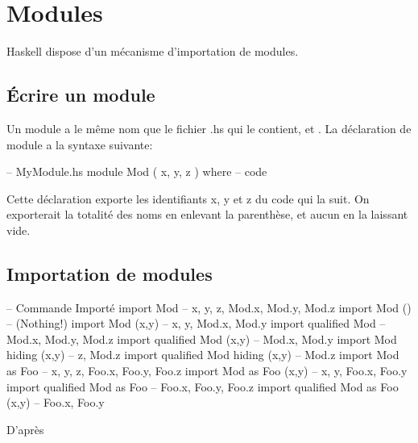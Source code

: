 \section{ Modules}
\label{modules}

Haskell dispose d'un mécanisme d'importation de modules.

\subsection{Écrire un module}

Un module a le même nom que le fichier .hs qui le contient, et . La déclaration de module a la syntaxe suivante:

\begin{haskellcode}
-- MyModule.hs
module Mod
    (
      x,
      y,
      z
    ) where
-- code
\end{haskellcode}

Cette déclaration exporte les identifiants x, y et z du code qui la suit. On exporterait la totalité des noms en enlevant la parenthèse, et aucun en la laissant vide.


\subsection{Importation de modules}
\label{import}

\begin{hslisting*}
\begin{haskellcode}
-- Commande                          Importé
import Mod                        -- x, y, z, Mod.x, Mod.y, Mod.z
import Mod ()                     -- (Nothing!)
import Mod (x,y)                  -- x, y, Mod.x, Mod.y
import qualified Mod              -- Mod.x, Mod.y, Mod.z
import qualified Mod (x,y)        -- Mod.x, Mod.y
import Mod hiding (x,y)           -- z, Mod.z
import qualified Mod hiding (x,y) -- Mod.z
import Mod as Foo                 -- x, y, z, Foo.x, Foo.y, Foo.z
import Mod as Foo (x,y)           -- x, y, Foo.x, Foo.y
import qualified Mod as Foo       -- Foo.x, Foo.y, Foo.z
import qualified Mod as Foo (x,y) -- Foo.x, Foo.y
\end{haskellcode}
\caption*{D'après \cite{Hudak2000}}
\end{hslisting*}
